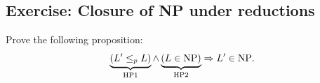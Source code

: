 \subsection{Exercise: Closure of NP under reductions}
\begin{notesresult}
Prove the following proposition:
\[\underbrace{(L'\leq_p L)}_{\mathrm{HP1}}\land
\underbrace{(L\in\mathrm{NP})}_{\mathrm{HP2}}\Rightarrow L'\in\mathrm{NP}.\]
\end{notesresult}
